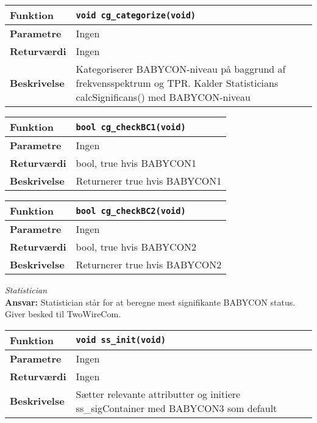 \begin{center}
    \begin{tabular}{ | l | p{} |}
    \hline
    \textbf{Funktion}	& \verb+void cg_categorize(void) +						\\ \hline
    \textbf{Parametre} 	& Ingen\\ \hline
    \textbf{Returværdi}	& Ingen	 								\\ \hline
    \textbf{Beskrivelse}& Kategoriserer BABYCON-niveau på baggrund af frekvensspektrum og TPR. Kalder Statisticians calcSignificans() med BABYCON-niveau		\\ \hline
    \end{tabular}
\end{center}

\begin{center}
    \begin{tabular}{ | l | p{} |}
    \hline
    \textbf{Funktion}	& \verb+bool cg_checkBC1(void) +						\\ \hline
    \textbf{Parametre} 	& Ingen 								\\ \hline
    \textbf{Returværdi}	& bool, true hvis BABYCON1 	 								\\ \hline
    \textbf{Beskrivelse}& Returnerer true hvis BABYCON1		\\ \hline
    \end{tabular}
\end{center}

\begin{center}
    \begin{tabular}{ | l | p{} |}
    \hline
    \textbf{Funktion}	& \verb+bool cg_checkBC2(void) +						\\ \hline
    \textbf{Parametre} 	& Ingen 								\\ \hline
    \textbf{Returværdi}	& bool, true hvis BABYCON2 	 								\\ \hline
    \textbf{Beskrivelse}& Returnerer true hvis BABYCON2		\\ \hline
    \end{tabular}
\end{center}



\textit{Statistician} \\
\textbf{Ansvar:} Statistician står for at beregne mest signifikante BABYCON status. Giver besked til TwoWireCom. 

\begin{center}
    \begin{tabular}{ | l | p{} |}
    \hline
    \textbf{Funktion}	& \verb+void ss_init(void) +						\\ \hline
    \textbf{Parametre} 	& Ingen		\\ \hline
    \textbf{Returværdi}	& Ingen	 								\\ \hline
    \textbf{Beskrivelse}& Sætter relevante attributter og initiere ss\_sigContainer med BABYCON3 som default	\\ \hline
    \end{tabular}
\end{center}

